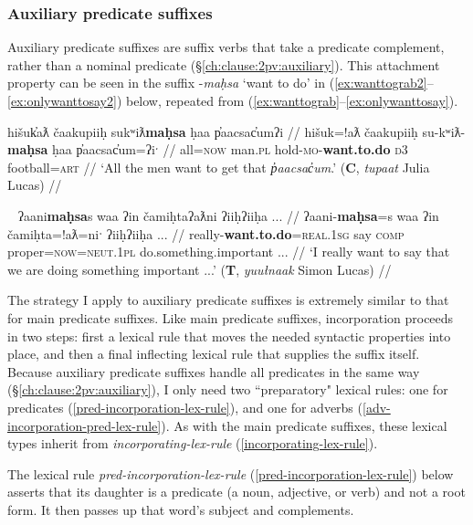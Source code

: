 \subsubsection{Auxiliary predicate suffixes} \label{ch:clause:analysis:auxpred}

Auxiliary predicate suffixes are suffix verbs that take a predicate complement, rather than a nominal predicate (\S\ref{ch:clause:2pv:auxiliary}). This attachment property can be seen in the suffix -\textit{maḥsa} `want to do' in (\ref{ex:wanttograb2}--\ref{ex:onlywanttosay2}) below, repeated from (\ref{ex:wanttograb}--\ref{ex:onlywanttosay}).

\ex \label{ex:wanttograb2}
\begingl
\glpreamble hišuk̓aƛ čaakupiiḥ sukʷiƛ\textbf{maḥsa} ḥaa p̓aacsac̓umʔi //
\gla hišuk=!aƛ čaakupiiḥ su-kʷiƛ-\textbf{maḥsa} ḥaa p̓aacsac̓um=ʔiˑ //
\glb all=\textsc{now} man.\textsc{pl} hold-\textsc{mo}-\textbf{want.to.do} \textsc{d3} football=\textsc{art} //
\glft `All the men want to get that \textit{p̓aacsac̓um}.' (\textbf{C}, \textit{tupaat} Julia Lucas) //
\endgl
\xe

\ex~ \label{ex:onlywanttosay2}
\begingl
\glpreamble ʔaani\textbf{maḥsa}s waa ʔin čamiḥtaʔaƛni ʔiiḥʔiiḥa ... //
\gla ʔaani-\textbf{maḥsa}=s waa ʔin čamiḥta=!aƛ=niˑ ʔiiḥʔiiḥa ... //
\glb really-\textbf{want.to.do}=\textsc{real.1sg} say \textsc{comp} proper=\textsc{now}=\textsc{neut.1pl} do.something.important ... //
\glft `I really want to say that we are doing something important ...' (\textbf{T}, \textit{yuułnaak} Simon Lucas) //
\endgl
\xe

The strategy I apply to auxiliary predicate suffixes is extremely similar to that for main predicate suffixes. Like main predicate suffixes, incorporation proceeds in two steps: first a lexical rule that moves the needed syntactic properties into place, and then a final inflecting lexical rule that supplies the suffix itself. Because auxiliary predicate suffixes handle all predicates in the same way (\S\ref{ch:clause:2pv:auxiliary}), I only need two ``preparatory" lexical rules: one for predicates (\ref{pred-incorporation-lex-rule}), and one for adverbs (\ref{adv-incorporation-pred-lex-rule}). As with the main predicate suffixes, these lexical types inherit from {\textit{incorporating-lex-rule}} (\ref{incorporating-lex-rule}).

The lexical rule \textit{pred-incorporation-lex-rule} (\ref{pred-incorporation-lex-rule}) below asserts that its daughter is a predicate (a noun, adjective, or verb) and not a root form. It then passes up that word's subject and complements.

